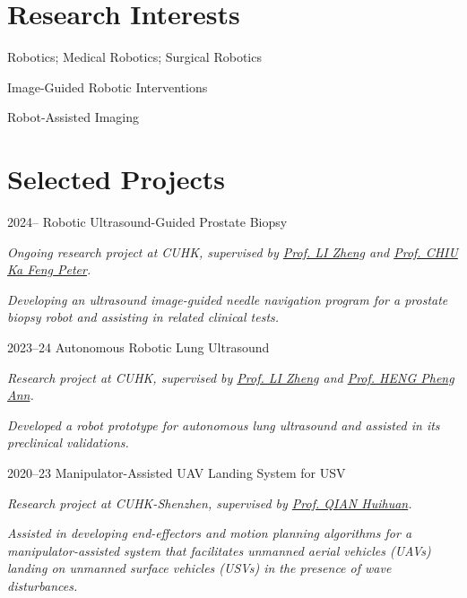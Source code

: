 \documentclass[11pt,letterpaper]{report}
\newcommand{\listitemspace}{0.25em}
\renewenvironment{itemize}
{\begin{list}{}{\setlength{\leftmargin}{0em}
			\setlength{\parskip}{0em}
			\setlength{\itemsep}{\listitemspace}
			\setlength{\parsep}{\listitemspace}}}
	{\end{list}}
\begin{document}
\section*{Research Interests}
\begin{itemize}
	\item Robotics; Medical Robotics; Surgical Robotics
	\item Image-Guided Robotic Interventions
	\item Robot-Assisted Imaging
\end{itemize}
	
\section*{Selected Projects}
\begin{tablist}
	
	\item[2024--] \tab Robotic Ultrasound-Guided Prostate Biopsy

	\textit{Ongoing research project at CUHK, supervised by  \href{https://www.surgery.cuhk.edu.hk/profile.asp?alias=zli}{Prof. LI Zheng} and \href{https://www.surgery.cuhk.edu.hk/profile.asp?alias=peterchiu}{Prof. CHIU Ka Feng Peter}.}
	
	\textit{Developing an ultrasound image-guided needle navigation program for a prostate biopsy robot and assisting in related clinical tests.}
	
	\item[2023--24] \tab Autonomous Robotic Lung Ultrasound
	
	\textit{Research project at CUHK, supervised by \href{https://www.surgery.cuhk.edu.hk/profile.asp?alias=zli}{Prof. LI Zheng} and \href{https://www.cse.cuhk.edu.hk/people/faculty/pheng-ann-heng/}{Prof. HENG Pheng Ann}.}
	
	\emph{Developed a robot prototype for autonomous lung ultrasound and assisted in its preclinical validations.}

	\item[2020--23] \tab Manipulator-Assisted UAV Landing System for USV
	
	\textit{Research project at CUHK-Shenzhen, supervised by \href{https://sse.cuhk.edu.cn/en/faculty/qianhuihuan}{Prof. QIAN Huihuan}.}
	
	\emph{Assisted in developing end-effectors and motion planning algorithms for a manipulator-assisted system that facilitates unmanned aerial vehicles (UAVs) landing on unmanned surface vehicles (USVs) in the presence of wave disturbances. }	
\end{tablist}
	
\end{document}

